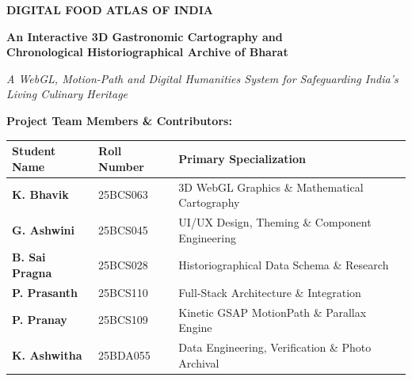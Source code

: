 \documentclass[11pt,a4paper]{report}
\begin{document}
\begin{titlepage}
    \centering
    \vspace*{0.5cm}
    
    {\Huge \bfseries \color{atlasSlateDark} DIGITAL FOOD ATLAS OF INDIA\par}
    \vspace{0.4cm}
    {\LARGE \bfseries \color{atlasOrange} An Interactive 3D Gastronomic Cartography and\\Chronological Historiographical Archive of Bharat\par}
    \vspace{0.8cm}
    {\large \itshape A WebGL, Motion-Path and Digital Humanities System for Safeguarding India's Living Culinary Heritage\par}
    
    \vspace{1.5cm}
    \begin{center}
    \end{center}
    
    \vspace{1.5cm}
    {\large \textbf{Project Team Members \& Contributors:}\par}
    \vspace{0.5cm}
    
    \begin{table}[h]
        \centering
        \renewcommand{\arraystretch}{1.2}
        \begin{tabular}{lll}
            \toprule
            \textbf{Student Name} & \textbf{Roll Number} & \textbf{Primary Specialization} \\
            \midrule
            \textbf{K. Bhavik}      & 25BCS063 & 3D WebGL Graphics \& Mathematical Cartography \\
            \textbf{G. Ashwini}     & 25BCS045 & UI/UX Design, Theming \& Component Engineering \\
            \textbf{B. Sai Pragna}  & 25BCS028 & Historiographical Data Schema \& Research \\
            \textbf{P. Prasanth}    & 25BCS110 & Full-Stack Architecture \& Integration \\
            \textbf{P. Pranay}      & 25BCS109 & Kinetic GSAP MotionPath \& Parallax Engine \\
            \textbf{K. Ashwitha}    & 25BDA055 & Data Engineering, Verification \& Photo Archival \\
            \bottomrule
        \end{tabular}
    \end{table}
    

\end{titlepage}
\end{document}
